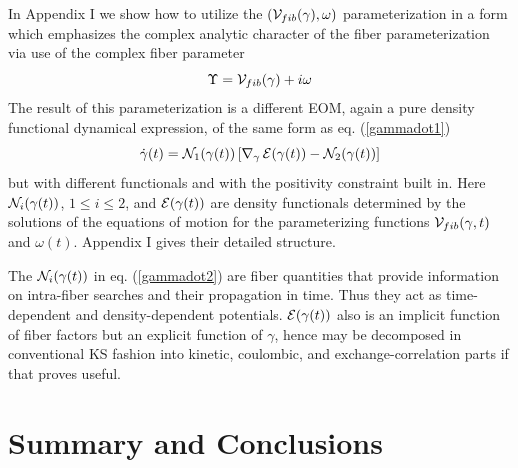 In Appendix I we show how to utilize the $\left( {\cal V}_{fib}(\gamma
),\omega \right) $ parameterization in a form which emphasizes the complex
analytic character of the fiber parameterization via use of the complex
fiber parameter 
\begin{equation}
\Upsilon ={\cal V}_{fib}(\gamma )+i\omega  \label{Ffactor}
\end{equation}%
The result of this parameterization is a different EOM, again a pure density
functional dynamical expression, of the same form as eq. (\ref{gammadot1}) 
\begin{equation}
\dot{\gamma}(t)={\cal N}_{1}(\gamma (t))\left[ \nabla _{\gamma }\,{\cal E}%
(\gamma (t))-{\cal N}_{2}(\gamma (t))\right]  \label{gammadot2}
\end{equation}%
but with different functionals and with the positivity constraint built in.
Here ${\cal N}_{i}(\gamma (t))$, $1\leq i\leq 2$, and ${\cal E}(\gamma (t))$
are density functionals determined by the solutions of the equations of
motion for the parameterizing functions ${\cal V}_{fib}(\gamma ,t)$ and $%
\omega (t)$. Appendix I gives their detailed structure.

The ${\cal N}_{i}(\gamma (t))$ in eq. (\ref{gammadot2}) are fiber quantities
that provide information on intra-fiber searches and their propagation in
time. Thus they act as time-dependent and density-dependent potentials. $%
{\cal E}(\gamma (t))$ also is an implicit function of fiber factors but an
explicit function of $\gamma $, hence may be decomposed in conventional KS
fashion into kinetic, coulombic, and exchange-correlation parts if that
proves useful.

\section{Summary and Conclusions}

